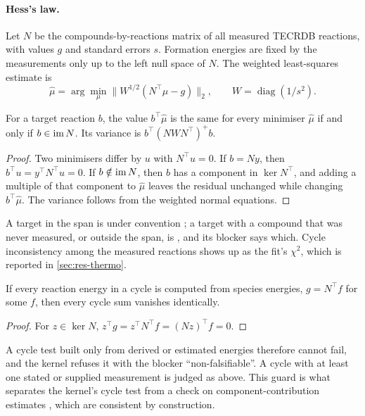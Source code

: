 \paragraph{Hess's law.}
Let $N$ be the compounds-by-reactions matrix of all measured TECRDB reactions, with values $g$ and standard errors $s$.
Formation energies are fixed by the measurements only up to the left null space of $N$.
The weighted least-squares estimate is
\begin{equation}
  \hat\mu = \arg\min_\mu \bigl\| W^{1/2}(N^\top\mu-g)\bigr\|_2,\qquad W=\operatorname{diag}(1/s^2).
\end{equation}

\begin{proposition}
\label{prop:hess}
For a target reaction $b$, the value $b^\top\hat\mu$ is the same for every minimiser $\hat\mu$ if and only if $b\in\operatorname{im} N$.
Its variance is $b^\top (NWN^\top)^{+} b$.
\end{proposition}
\begin{proof}
Two minimisers differ by $u$ with $N^\top u=0$.
If $b=Ny$, then $b^\top u=y^\top N^\top u=0$.
If $b\notin\operatorname{im} N$, then $b$ has a component in $\ker N^\top$, and adding a multiple of that component to $\hat\mu$ leaves the residual unchanged while changing $b^\top\hat\mu$.
The variance follows from the weighted normal equations.
\end{proof}

A target in the span is  under convention ; a target with a compound that was never measured, or outside the span, is , and its blocker says which.
Cycle inconsistency among the measured reactions shows up as the fit's $\chi^2$, which is reported in \cref{sec:res-thermo}.

\begin{proposition}
\label{prop:falsifiable}
If every reaction energy in a cycle is computed from species energies, $g=N^\top f$ for some $f$, then every cycle sum vanishes identically.
\end{proposition}
\begin{proof}
For $z\in\ker N$, $z^\top g = z^\top N^\top f = (Nz)^\top f = 0$.
\end{proof}

A cycle test built only from derived or estimated energies therefore cannot fail, and the kernel refuses it with the blocker ``non-falsifiable''.
A cycle with at least one stated or supplied measurement is judged as above.
This guard is what separates the kernel's cycle test from a check on component-contribution estimates \citep{noor2013component}, which are consistent by construction.

